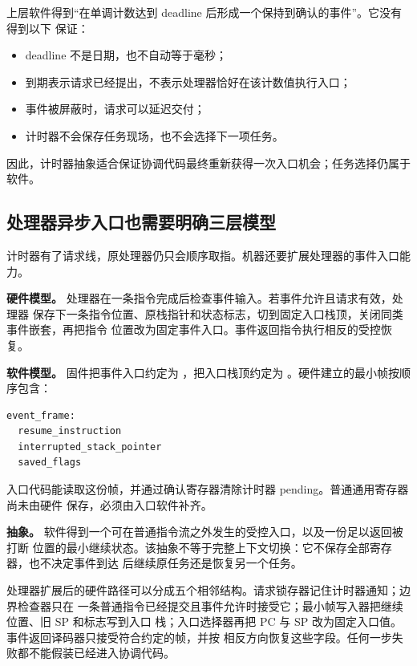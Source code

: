 上层软件得到“在单调计数达到 deadline 后形成一个保持到确认的事件”。它没有得到以下
保证：

\begin{itemize}
\item deadline 不是日期，也不自动等于毫秒；
\item 到期表示请求已经提出，不表示处理器恰好在该计数值执行入口；
\item 事件被屏蔽时，请求可以延迟交付；
\item 计时器不会保存任务现场，也不会选择下一项任务。
\end{itemize}

因此，计时器抽象适合保证协调代码最终重新获得一次入口机会；任务选择仍属于软件。

\subsection{处理器异步入口也需要明确三层模型}

计时器有了请求线，原处理器仍只会顺序取指。机器还要扩展处理器的事件入口能力。

\textbf{硬件模型。} 处理器在一条指令完成后检查事件输入。若事件允许且请求有效，处理器
保存下一条指令位置、原栈指针和状态标志，切到固定入口栈顶，关闭同类事件嵌套，再把指令
位置改为固定事件入口。事件返回指令执行相反的受控恢复。

\textbf{软件模型。} 固件把事件入口约定为 ，把入口栈顶约定为
。硬件建立的最小帧按顺序包含：

\begin{lstlisting}
event_frame:
  resume_instruction
  interrupted_stack_pointer
  saved_flags
\end{lstlisting}

入口代码能读取这份帧，并通过确认寄存器清除计时器 pending。普通通用寄存器尚未由硬件
保存，必须由入口软件补齐。

\textbf{抽象。} 软件得到一个可在普通指令流之外发生的受控入口，以及一份足以返回被打断
位置的最小继续状态。该抽象不等于完整上下文切换：它不保存全部寄存器，也不决定事件到达
后继续原任务还是恢复另一个任务。

处理器扩展后的硬件路径可以分成五个相邻结构。请求锁存器记住计时器通知；边界检查器只在
一条普通指令已经提交且事件允许时接受它；最小帧写入器把继续位置、旧 SP 和标志写到入口
栈；入口选择器再把 PC 与 SP 改为固定入口值。事件返回译码器只接受符合约定的帧，并按
相反方向恢复这些字段。任何一步失败都不能假装已经进入协调代码。


